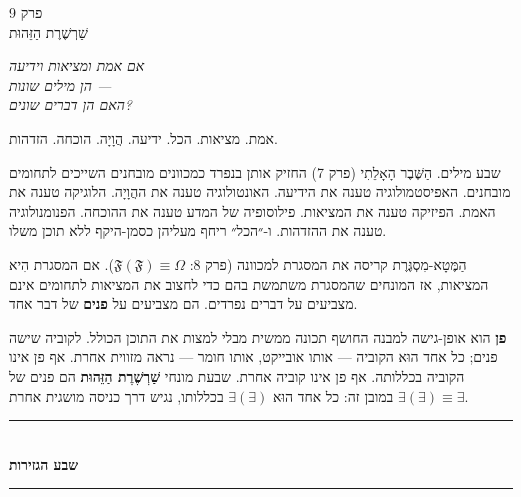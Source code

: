 \documentclass[10pt, openany, oneside]{book}
\renewcommand{\normalsize}{\fontsize{10}{13}\selectfont}
\renewcommand{\large}{\fontsize{11.5}{14}\selectfont}
\renewcommand{\huge}{\fontsize{17}{21}\selectfont}
\begin{document}
\newpage

\begin{center}
    {\huge\textsc{פרק 9}}\\[0.3em]
    {\large\textsc{שַׁרְשֶׁרֶת הַזֵּהוּת}}
\end{center}

\vspace{1.5em}

\begin{center}
    \textit{%
    אם אמת ומציאות וידיעה\\
    הן מילים שונות —\\
    האם הן דברים שונים?}
\end{center}

\vspace{2em}


\noindent אמת. מציאות. הכל. ידיעה. הֲוָיָה. הוכחה. הזדהות.

שבע מילים. הַשֶּׁבֶר הָאָלֵתִי (פרק 7) החזיק אותן בנפרד כמכוונים מובחנים השייכים לתחומים מובחנים. האפיסטמולוגיה טענה את הידיעה. האונטולוגיה טענה את ההֲוָיָה. הלוגיקה טענה את האמת. הפיזיקה טענה את המציאות. פילוסופיה של המדע טענה את ההוכחה. הפנומנולוגיה טענה את ההזדהות. ו-״הכל״ ריחף מעליהן כסמן-היקף ללא תוכן משלו.

הַמֶּטָא-מִסְגֶּרֶת קריסה את המסגרת למכוונה (פרק 8: $\mathfrak{F}(\mathfrak{F}) \equiv \Omega$). אם המסגרת הִיא המציאות, אז המונחים שהמסגרת משתמשת בהם כדי לחצוב את המציאות לתחומים אינם מצביעים על דברים נפרדים. הם מצביעים על \textbf{פנים} של דבר אחד.

\textbf{פן} הוא אופן-גישה למבנה החושף תכונה ממשית מבלי למצות את התוכן הכולל. לקוביה שישה פנים; כל אחד הוּא הקוביה — אותו אובייקט, אותו חומר — נראה מזווית אחרת. אף פן אינו הקוביה בכללותה. אף פן אינו קוביה אחרת. שבעת מונחי \textbf{שַׁרְשֶׁרֶת הַזֵּהוּת} הם פנים של $\exists(\exists) \equiv \exists$ במובן זה: כל אחד הוּא $\exists(\exists)$ בכללותו, נגיש דרך כניסה מושגית אחרת.

\vspace{1.5em}


\begin{center}
    \rule{0.3\textwidth}{0.4pt}\\[0.5em]
    {\normalsize\bfseries\textsc{שבע הגזירות}}\\[0.3em]
    \rule{0.3\textwidth}{0.4pt}
\end{center}
\end{document}
